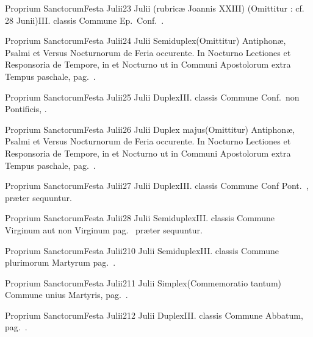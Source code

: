 \documentclass[nocturnale-romanum.tex]{subfiles}
\begin{document}
	{Proprium Sanctorum}{Festa Julii}{2}{3 Julii (rubricæ Joannis XXIII)}
	{(Omittitur : cf. 28 Junii)}{III. classis}
	{}
	{Commune Ep.\ Conf.\ \pageref{M-COPO}.}

	{Proprium Sanctorum}{Festa Julii}{2}{4 Julii}
	{Semiduplex}{(Omittitur)}
	{Antiphonæ, Psalmi et Versus Nocturnorum de Feria occurente. In  Nocturno Lectiones et Responsoria de Tempore, in  et  Nocturno ut in Communi Apostolorum extra Tempus paschale, pag.\ \pageref{M-APEXN2R1}.}
	{}

	{Proprium Sanctorum}{Festa Julii}{2}{5 Julii}
	{Duplex}{III. classis}
	{Commune Conf.\ non Pontificis, \pageref{M-CONP}.}
	{}

	{Proprium Sanctorum}{Festa Julii}{2}{6 Julii}
	{Duplex majus}{(Omittitur)}
	{Antiphonæ, Psalmi et Versus Nocturnorum de Feria occurente. In  Nocturno Lectiones et Responsoria de Tempore, in  et  Nocturno ut in Communi Apostolorum extra Tempus paschale, pag.\ \pageref{M-APEXN2R1}.}
	{}

	{Proprium Sanctorum}{Festa Julii}{2}{7 Julii}
	{Duplex}{III. classis}
	{Commune Conf Pont.\ \pageref{M-COPO}, præter sequuntur.}
	{}

	{Proprium Sanctorum}{Festa Julii}{2}{8 Julii}
	{Semiduplex}{III. classis}
	{Commune Virginum aut non Virginum pag.\ \pageref{M-MU} præter sequuntur.}
	{}

	{Proprium Sanctorum}{Festa Julii}{2}{10 Julii}
	{Semiduplex}{III. classis}
	{Commune plurimorum Martyrum pag.\ \pageref{M-PMEX}.}
	{}

	{Proprium Sanctorum}{Festa Julii}{2}{11 Julii}
	{Simplex}{(Commemoratio tantum)}
	{Commune unius Martyris, pag.\ \pageref{M-UMEX}.}
	{}

	{Proprium Sanctorum}{Festa Julii}{2}{12 Julii}
	{Duplex}{III. classis}
	{Commune Abbatum, pag.\ \pageref{M-COAB}.}
	{}
\end{document}

